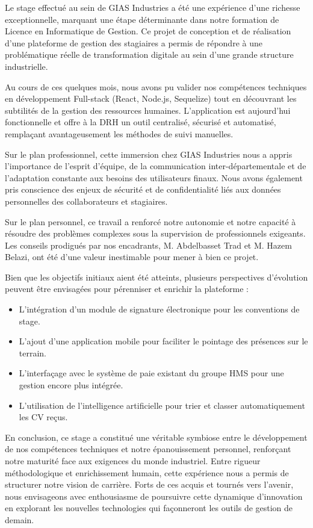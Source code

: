 Le stage effectué au sein de GIAS Industries a été une expérience d'une richesse exceptionnelle, marquant une étape déterminante dans notre formation de Licence en Informatique de Gestion. Ce projet de conception et de réalisation d'une plateforme de gestion des stagiaires a permis de répondre à une problématique réelle de transformation digitale au sein d'une grande structure industrielle.

Au cours de ces quelques mois, nous avons pu valider nos compétences techniques en développement Full-stack (React, Node.js, Sequelize) tout en découvrant les subtilités de la gestion des ressources humaines. L'application est aujourd'hui fonctionnelle et offre à la DRH un outil centralisé, sécurisé et automatisé, remplaçant avantageusement les méthodes de suivi manuelles.

\vspace{1cm}

Sur le plan professionnel, cette immersion chez GIAS Industries nous a appris l'importance de l'esprit d'équipe, de la communication inter-départementale et de l'adaptation constante aux besoins des utilisateurs finaux. Nous avons également pris conscience des enjeux de sécurité et de confidentialité liés aux données personnelles des collaborateurs et stagiaires.

Sur le plan personnel, ce travail a renforcé notre autonomie et notre capacité à résoudre des problèmes complexes sous la supervision de professionnels exigeants. Les conseils prodigués par nos encadrants, M. Abdelbasset Trad et M. Hazem Belazi, ont été d'une valeur inestimable pour mener à bien ce projet.

\vspace{1cm}

Bien que les objectifs initiaux aient été atteints, plusieurs perspectives d'évolution peuvent être envisagées pour pérenniser et enrichir la plateforme :
\begin{itemize}
    \item L'intégration d'un module de signature électronique pour les conventions de stage.
    \item L'ajout d'une application mobile pour faciliter le pointage des présences sur le terrain.
    \item L'interfaçage avec le système de paie existant du groupe HMS pour une gestion encore plus intégrée.
    \item L'utilisation de l'intelligence artificielle pour trier et classer automatiquement les CV reçus.
\end{itemize}

En conclusion, ce stage a constitué une véritable symbiose entre le développement de nos compétences techniques et notre épanouissement personnel, renforçant notre maturité face aux exigences du monde industriel. Entre rigueur méthodologique et enrichissement humain, cette expérience nous a permis de structurer notre vision de carrière. Forts de ces acquis et tournés vers l'avenir, nous envisageons avec enthousiasme de poursuivre cette dynamique d'innovation en explorant les nouvelles technologies qui façonneront les outils de gestion de demain.
